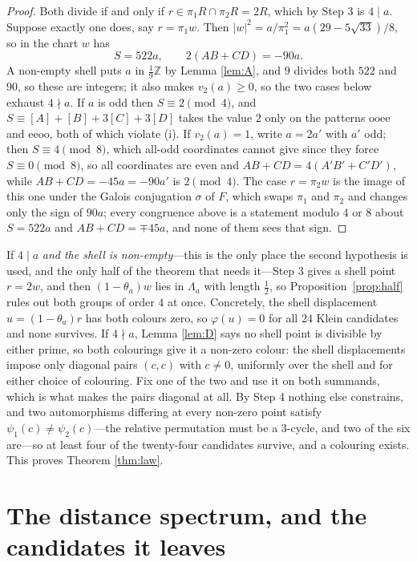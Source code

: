 \documentclass[11pt,reqno]{amsart}
\theoremstyle{plain}
\theoremstyle{definition}
\newcommand{\Z}{\mathbb{Z}}
\newcommand{\Lat}{R}
\newcommand{\Lam}{\Lambda}
\begin{document}
\begin{proof}
Both divide if and only if $r \in \pi_1\Lat \cap \pi_2\Lat = 2\Lat$, which by
Step 3 is $4 \mid a$. Suppose exactly one does, say $r = \pi_1 w$. Then
$\lvert w \rvert^2 = a/\pi_1^2 = a(29 - 5\sqrt{33})/8$, so in the chart $w$ has
\[
  S = 522a, \qquad 2(AB+CD) = -90a .
\]
A non-empty shell puts $a$ in $\tfrac19\Z$ by Lemma \ref{lem:A}, and $9$ divides
both $522$ and $90$, so these are integers; it also makes $v_2(a) \ge 0$, so the
two cases below exhaust $4 \nmid a$. If $a$ is odd then $S \equiv 2 \pmod 4$, and
$S \equiv [A]+[B]+3[C]+3[D]$ takes the value $2$ only on the patterns
$\mathrm{ooee}$ and $\mathrm{eeoo}$, both of which violate (i). If
$v_2(a) = 1$, write $a = 2a'$ with $a'$ odd; then $S \equiv 4 \pmod 8$,
which all-odd coordinates cannot give since they force $S \equiv 0 \pmod 8$, so all
coordinates are even and $AB + CD = 4(A'B' + C'D')$, while $AB + CD = -45a = -90a'$
is $2 \pmod 4$. The case $r = \pi_2 w$ is the image of this one under the
Galois conjugation $\sigma$ of $F$, which swaps $\pi_1$ and $\pi_2$ and changes
only the sign of $90a$; every congruence above is a statement modulo $4$ or $8$
about $S = 522a$ and $AB+CD = \mp45a$, and none of them sees that sign.
\end{proof}

If $4 \mid a$ \emph{and the shell is non-empty}---this is the only place the
second hypothesis is used, and the only half of the theorem that needs it---Step 3
gives a shell point $r = 2w$, and then $(1-\theta_a)w$ lies in $\Lam_a$ with length
$\tfrac12$, so Proposition~\ref{prop:half} rules out both groups of order $4$ at
once. Concretely, the shell displacement $u = (1-\theta_a)r$ has both colours zero,
so $\varphi(u) = 0$ for all $24$ Klein candidates and none survives. If $4 \nmid a$, Lemma
\ref{lem:D} says no shell point is divisible by either prime, so both colourings
give it a non-zero colour: the shell displacements impose only diagonal pairs
$(c,c)$ with $c \ne 0$, uniformly over the shell and for either choice of
colouring. Fix one of the two and use it on both summands, which is what makes
the pairs diagonal at all. By Step 4 nothing else constrains, and two automorphisms
differing at every non-zero point satisfy $\psi_1(c) \ne \psi_2(c)$---the relative
permutation must be a $3$-cycle, and two of the six are---so at least four of the
twenty-four candidates survive, and a colouring exists. This proves Theorem \ref{thm:law}.
\hfill\qedsymbol

\section{The distance spectrum, and the candidates it leaves}\label{sec:seven}
\end{document}
